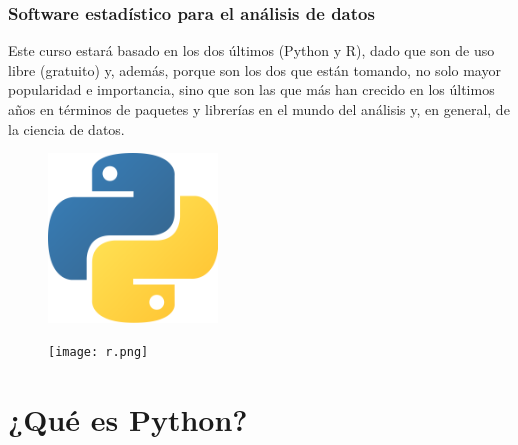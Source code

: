 \begin{frame}[fragile] 
    \frametitle{Software estadístico para el análisis de datos}

    \begin{center}
Este curso estará basado en los dos últimos (Python y R), dado que son de uso libre (gratuito) y, además, porque son los dos que están tomando, no solo mayor popularidad e importancia, sino que son las que más han crecido en los últimos años en términos de paquetes y librerías en el mundo del análisis y, en general, de la ciencia de datos.\newline    
    \end{center}

\begin{multicols}{2}
    \begin{figure}[H]
            \includegraphics [width =0.4\textwidth]{python.png}
    \end{figure}
        \begin{figure}[H]
            \texttt{[image: r.png]}
    \end{figure}
\end{multicols}
\end{frame}

\section{¿Qué es Python?}

